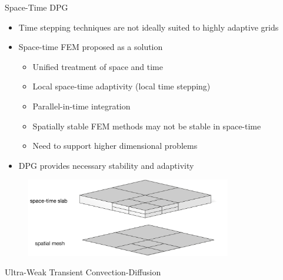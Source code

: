 \documentclass[final]{beamer}
\newlength{\onecolwid}
\begin{document}
\begin{frame}[t]
\begin{columns}[t]
\begin{column}{\onecolwid}
\begin{block}{Space-Time DPG}

\begin{itemize}
  \item Time stepping techniques are not ideally suited to highly adaptive grids
  \item Space-time FEM proposed as a solution
  \begin{itemize}
    \item[\textcolor{green}{\Checkmark}] Unified treatment of space and time
    \item[\textcolor{green}{\Checkmark}] Local space-time adaptivity (local time stepping)
    \item[\textcolor{green}{\Checkmark}] Parallel-in-time integration
    \item[\textcolor{red}{\XSolidBrush}] Spatially stable FEM methods may not be stable in space-time
    \item[\textcolor{red}{\XSolidBrush}] Need to support higher dimensional problems
  \end{itemize}
  \item DPG provides necessary stability and adaptivity
\end{itemize}
\begin{figure}[b]
\centering
\includegraphics[width=0.8\textwidth]{Schematics/SpaceTimeSchematic}
\end{figure}

\end{block}

\begin{block}{Ultra-Weak Transient Convection-Diffusion}


\end{block}
\end{column}
\end{columns}
\end{frame}
\end{document}
